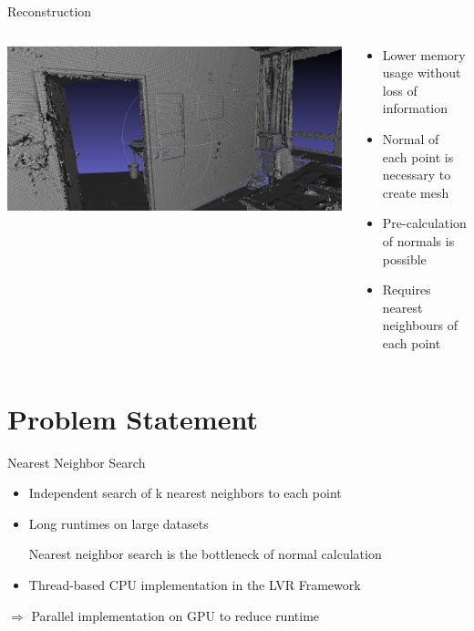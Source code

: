 \documentclass{beamer}
\begin{document}
\begin{frame}{Reconstruction}
	\begin{columns}
		\begin{column}{0.5\textwidth}
			\includegraphics[width=1.0\textwidth]{police_mesh.png}
		\end{column}
		\begin{column}{0.5\textwidth}
			\begin{itemize}
				\item Lower memory usage without loss of information
				\item Normal of each point is necessary to create mesh
				\item Pre-calculation of normals is possible
				\item Requires nearest neighbours of each point
			\end{itemize}
		\end{column}
	\end{columns}
\end{frame}

\section{Problem Statement}

\begin{frame}{Nearest Neighbor Search}
	\begin{itemize}
		\item Independent search of k nearest neighbors to each point
		\item Long runtimes on large datasets
		\begin{block}{}
			\centering Nearest neighbor search is the bottleneck of normal calculation
		\end{block}
		\item Thread-based CPU implementation in the LVR Framework
	\end{itemize}
	\medskip
	\centering $\Rightarrow$ Parallel implementation on GPU to reduce runtime
\end{frame}
\end{document}
